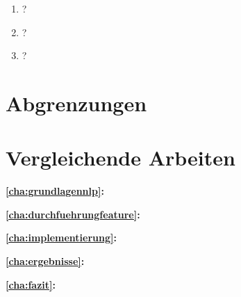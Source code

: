 \begin{enumerate}[label=\textit{\textbf{Forschungsfrage \#\arabic*}}, leftmargin=4.25cm, resume]
    \item \label{FF1} \glqq ?\grqq{}
    \item \label{FF2} \glqq ?\grqq{}
    \item \label{FF3} \glqq ?\grqq{}
\end{enumerate}

\lipsum[1]

\section{Abgrenzungen}
\label{sec:abgrenzungen}

\lipsum[2]

\section{Vergleichende Arbeiten}
\label{cha:relatedwork}

\lipsum[2]

\clearpage

\textbf{\autoref{cha:grundlagennlp}: }\\
\lipsum[2]

\textbf{\autoref{cha:durchfuehrungfeature}: }\\
\lipsum[2]

\textbf{\autoref{cha:implementierung}: }\\
\lipsum[2]

\textbf{\autoref{cha:ergebnisse}: }\\
\lipsum[2]

\textbf{\autoref{cha:fazit}: }\\
\lipsum[2]
